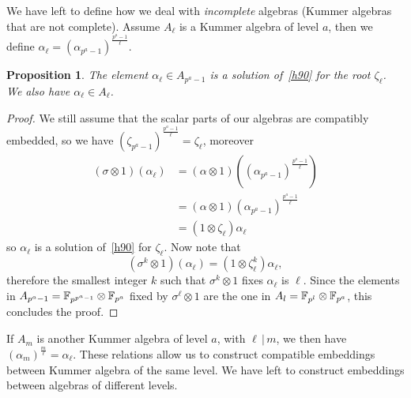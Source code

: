 \documentclass{sig-alternate}
\newtheorem{proposition}[theorem]{Proposition}
\begin{document}
We have left to define how we deal with \emph{incomplete} algebras (Kummer
algebras that are not complete). Assume $A_\ell$ is a Kummer algebra of level
$a$, then we define $\alpha_\ell = (\alpha_{p^a-1})^{\frac{p^a-1}{\ell}}$.
\begin{proposition}
  The element $\alpha_\ell\in A_{p^a-1}$ is a solution of~\eqref{h90} for the
  root $\zeta_\ell$. We also have $\alpha_\ell\in A_\ell$.
\end{proposition}
\begin{proof}
We still assume that the scalar parts of our algebras are compatibly
embedded, so we have $(\zeta_{p^a-1})^{\frac{p^a-1}{\ell}} = \zeta_\ell$,
moreover
\begin{align*}
  (\sigma\otimes1)(\alpha_\ell) &=
  (\alpha\otimes1)((\alpha_{p^a-1})^{\frac{p^a-1}{\ell}}) \\
  &= (\alpha\otimes1)(\alpha_{p^a-1})^{\frac{p^a-1}{\ell}} \\
  &= (1\otimes\zeta_\ell)\alpha_\ell
\end{align*}
so $\alpha_\ell$ is a solution of~\eqref{h90} for $\zeta_\ell$. Now note that 
\[
  (\sigma^k\otimes1)(\alpha_\ell) = (1\otimes\zeta_\ell^k)\alpha_\ell,
\]
therefore the smallest integer $k$ such that $\sigma^k\otimes1$ fixes
$\alpha_\ell$ is $\ell$. Since the elements in
$A_{p^a-1}=\mathbb{F}_{p^{p^a-1}}\otimes\mathbb{F}_{p^a}$ fixed by
$\sigma^\ell\otimes1$ are the one in
$A_l = \mathbb{F}_{p^l}\otimes\mathbb{F}_{p^a}$, this concludes the
proof.
\end{proof}
If $A_m$ is another Kummer algebra of level $a$, with $\ell\,|\,m$, we then have
$(\alpha_m)^{\frac{m}{\ell}} = \alpha_\ell$. These relations allow us to construct
compatible embeddings between Kummer algebra of the same level. We have left to
construct embeddings between algebras of different levels.
\end{document}
